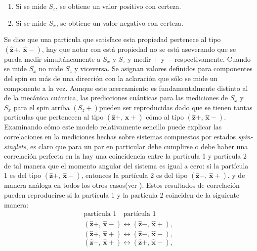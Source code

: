 \documentclass[a4paper]{article}
\begin{document}
\begin{enumerate}
\item Si se mide $S_z$, se obtiene un valor positivo con certeza.
\item Si se mide $S_x$, se obtiene un valor negativo con certeza.
\end{enumerate}
Se dice que una partícula que satisface esta propiedad pertenece al tipo $(\mathbf{\hat{z}}+,\, \mathbf{\hat{x}}-)$, hay que notar con está propiedad no se está aseverando que se pueda medir simultáneamente a $S_x$ y $S_z$ y medir $+$ y $-$ respectivamente. Cuando se mide $S_x$ no mide $S_z$ y viceversa. Se asignan valores definidos para componentes del spin en más de una dirección con la aclaración que sólo se mide un componente a la vez. Aunque este acercamiento es fundamentalmente distinto al de la mecánica cuántica, las predicciones cuánticas para las mediciones de $S_x$ y $S_x$ para el spin arriba $(S_z+)$pueden ser reproducidas dado que se tienen tantas partículas que pertenecen al tipo $(\mathbf{\hat{z}}+,\, \mathbf{\hat{x}}+)$ cómo al tipo $(\mathbf{\hat{z}}+,\, \mathbf{\hat{x}}-)$.\\
Examinando cómo este modelo relativamente sencillo puede explicar las correlaciones en la mediciones hechas sobre sistemas compuestos por estados \textit{spin-singlets}, es claro que para un par en particular debe cumplirse o debe haber una correlación perfecta en la hay una coincidencia entre la partícula 1 y partícula 2 de tal manera que el momento angular del sistema es igual a cero: si la partícula 1 es del tipo $(\mathbf{\hat{z}}+,\, \mathbf{\hat{x}}-)$, entonces la partícula 2 es del tipo $(\mathbf{\hat{z}}-,\, \mathbf{\hat{x}}+)$, y de manera análoga en todos los otros casos(ver \cite{Sakurai}). Estos resultados de correlación pueden reproducirse si la partícula 1 y la partícula 2 coinciden de la siguiente manera:
\begin{equation}
\begin{aligned}
\text{partícula 1}\,\,\,\,\,\,\text{partícula 1}\\
(\mathbf{\hat{z}}+,\, \mathbf{\hat{x}}-) \leftrightarrow (\mathbf{\hat{z}}-,\, \mathbf{\hat{x}}+), 
\end{aligned}
\end{equation}
\begin{equation}\label{eq::type_1_singlet_state}
(\mathbf{\hat{z}}+,\, \mathbf{\hat{x}}+) \leftrightarrow (\mathbf{\hat{z}}-,\, \mathbf{\hat{x}}-),
\end{equation}
\begin{equation}
(\mathbf{\hat{z}}-,\, \mathbf{\hat{x}}+) \leftrightarrow (\mathbf{\hat{z}}+,\, \mathbf{\hat{x}}-),
\end{equation}
\end{document}
